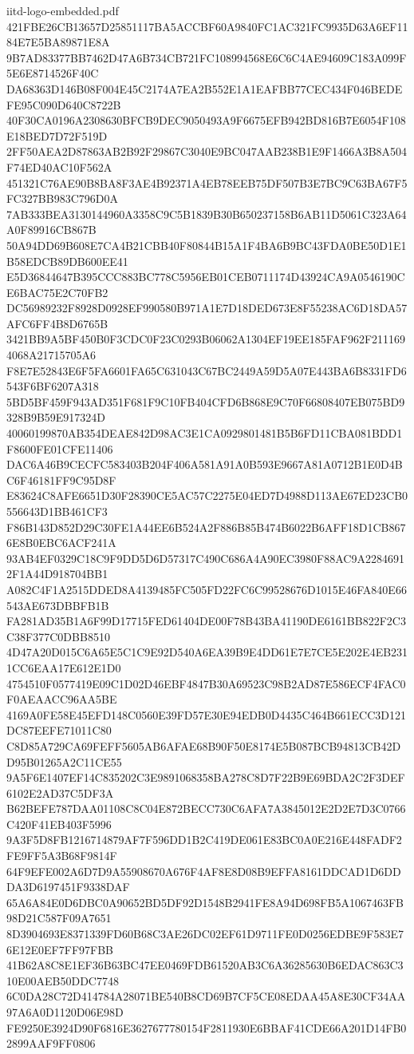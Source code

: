 \begin{filecontents*}[overwrite]{iitd-logo-embedded.pdf}
421FBE26CB13657D25851117BA5ACCBF60A9840FC1AC321FC9935D63A6EF1184E7E5BA89871E8A
9B7AD83377BB7462D47A6B734CB721FC108994568E6C6C4AE94609C183A099F5E6E8714526F40C
DA68363D146B08F004E45C2174A7EA2B552E1A1EAFBB77CEC434F046BEDEFE95C090D640C8722B
40F30CA0196A2308630BFCB9DEC9050493A9F6675EFB942BD816B7E6054F108E18BED7D72F519D
2FF50AEA2D87863AB2B92F29867C3040E9BC047AAB238B1E9F1466A3B8A504F74ED40AC10F562A
451321C76AE90B8BA8F3AE4B92371A4EB78EEB75DF507B3E7BC9C63BA67F5FC327BB983C796D0A
7AB333BEA3130144960A3358C9C5B1839B30B650237158B6AB11D5061C323A64A0F89916CB867B
50A94DD69B608E7CA4B21CBB40F80844B15A1F4BA6B9BC43FDA0BE50D1E1B58EDCB89DB600EE41
E5D36844647B395CCC883BC778C5956EB01CEB0711174D43924CA9A0546190CE6BAC75E2C70FB2
DC56989232F8928D0928EF990580B971A1E7D18DED673E8F55238AC6D18DA57AFC6FF4B8D6765B
3421BB9A5BF450B0F3CDC0F23C0293B06062A1304EF19EE185FAF962F2111694068A21715705A6
F8E7E52843E6F5FA6601FA65C631043C67BC2449A59D5A07E443BA6B8331FD6543F6BF6207A318
5BD5BF459F943AD351F681F9C10FB404CFD6B868E9C70F66808407EB075BD9328B9B59E917324D
40060199870AB354DEAE842D98AC3E1CA0929801481B5B6FD11CBA081BDD1F8600FE01CFE11406
DAC6A46B9CECFC583403B204F406A581A91A0B593E9667A81A0712B1E0D4BC6F46181FF9C95D8F
E83624C8AFE6651D30F28390CE5AC57C2275E04ED7D4988D113AE67ED23CB0556643D1BB461CF3
F86B143D852D29C30FE1A44EE6B524A2F886B85B474B6022B6AFF18D1CB8676E8B0EBC6ACF241A
93AB4EF0329C18C9F9DD5D6D57317C490C686A4A90EC3980F88AC9A22846912F1A44D918704BB1
A082C4F1A2515DDED8A4139485FC505FD22FC6C99528676D1015E46FA840E66543AE673DBBFB1B
FA281AD35B1A6F99D17715FED61404DE00F78B43BA41190DE6161BB822F2C3C38F377C0DBB8510
4D47A20D015C6A65E5C1C9E92D540A6EA39B9E4DD61E7E7CE5E202E4EB2311CC6EAA17E612E1D0
4754510F0577419E09C1D02D46EBF4847B30A69523C98B2AD87E586ECF4FAC0F0AEAACC96AA5BE
4169A0FE58E45EFD148C0560E39FD57E30E94EDB0D4435C464B661ECC3D121DC87EEFE71011C80
C8D85A729CA69FEFF5605AB6AFAE68B90F50E8174E5B087BCB94813CB42DD95B01265A2C11CE55
9A5F6E1407EF14C835202C3E9891068358BA278C8D7F22B9E69BDA2C2F3DEF6102E2AD37C5DF3A
B62BEFE787DAA01108C8C04E872BECC730C6AFA7A3845012E2D2E7D3C0766C420F41EB403F5996
9A3F5D8FB1216714879AF7F596DD1B2C419DE061E83BC0A0E216E448FADF2FE9FF5A3B68F9814F
64F9EFE002A6D7D9A55908670A676F4AF8E8D08B9EFFA8161DDCAD1D6DDDA3D6197451F9338DAF
65A6A84E0D6DBC0A90652BD5DF92D1548B2941FE8A94D698FB5A1067463FB98D21C587F09A7651
8D3904693E8371339FD60B68C3AE26DC02EF61D9711FE0D0256EDBE9F583E76E12E0EF7FF97FBB
41B62A8C8E1EF36B63BC47EE0469FDB61520AB3C6A36285630B6EDAC863C310E00AEB50DDC7748
6C0DA28C72D414784A28071BE540B8CD69B7CF5CE08EDAA45A8E30CF34AA97A6A0D1120D06E98D
FE9250E3924D90F6816E3627677780154F2811930E6BBAF41CDE66A201D14FB02899AAF9FF0806

\end{filecontents*}
